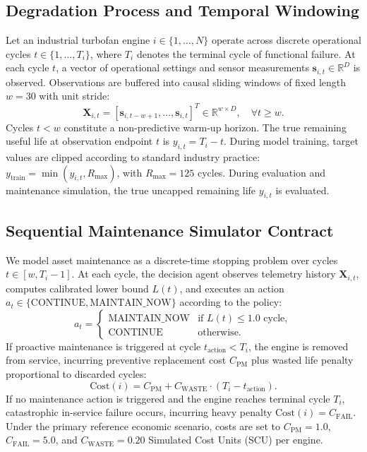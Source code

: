 \documentclass[conference,a4paper]{IEEEtran}
\newcommand{\Cost}{\text{Cost}}
\newcommand{\CPM}{C_{\text{PM}}}
\newcommand{\CFAIL}{C_{\text{FAIL}}}
\newcommand{\CWASTE}{C_{\text{WASTE}}}
\begin{document}
\subsection{Degradation Process and Temporal Windowing}
Let an industrial turbofan engine $i \in \{1, \dots, N\}$ operate across discrete operational cycles $t \in \{1, \dots, T_i\}$, where $T_i$ denotes the terminal cycle of functional failure. At each cycle $t$, a vector of operational settings and sensor measurements $\mathbf{s}_{i,t} \in \mathbb{R}^{D}$ is observed. Observations are buffered into causal sliding windows of fixed length $w=30$ with unit stride:
\begin{equation}
\mathbf{X}_{i,t} = [\mathbf{s}_{i,t-w+1}, \dots, \mathbf{s}_{i,t}]^T \in \mathbb{R}^{w \times D}, \quad \forall t \ge w.
\end{equation}
Cycles $t < w$ constitute a non-predictive warm-up horizon. The true remaining useful life at observation endpoint $t$ is $y_{i,t} = T_i - t$. During model training, target values are clipped according to standard industry practice: $y_{\text{train}} = \min(y_{i,t}, R_{\text{max}})$, with $R_{\text{max}} = 125$ cycles. During evaluation and maintenance simulation, the true uncapped remaining life $y_{i,t}$ is evaluated.

\subsection{Sequential Maintenance Simulator Contract}
We model asset maintenance as a discrete-time stopping problem over cycles $t \in [w, T_i - 1]$. At each cycle, the decision agent observes telemetry history $\mathbf{X}_{i,t}$, computes calibrated lower bound $L(t)$, and executes an action $a_t \in \{\text{CONTINUE}, \text{MAINTAIN\_NOW}\}$ according to the policy:
\begin{equation}
a_t = \begin{cases} 
\text{MAINTAIN\_NOW} & \text{if } L(t) \le 1.0 \text{ cycle}, \\ 
\text{CONTINUE} & \text{otherwise}. 
\end{cases}
\end{equation}
If proactive maintenance is triggered at cycle $t_{\text{action}} < T_i$, the engine is removed from service, incurring preventive replacement cost $\CPM$ plus wasted life penalty proportional to discarded cycles:
\begin{equation}
\Cost(i) = \CPM + \CWASTE \cdot (T_i - t_{\text{action}}).
\end{equation}
If no maintenance action is triggered and the engine reaches terminal cycle $T_i$, catastrophic in-service failure occurs, incurring heavy penalty $\Cost(i) = \CFAIL$. Under the primary reference economic scenario, costs are set to $\CPM = 1.0$, $\CFAIL = 5.0$, and $\CWASTE = 0.20$ Simulated Cost Units (SCU) per engine.
\end{document}
